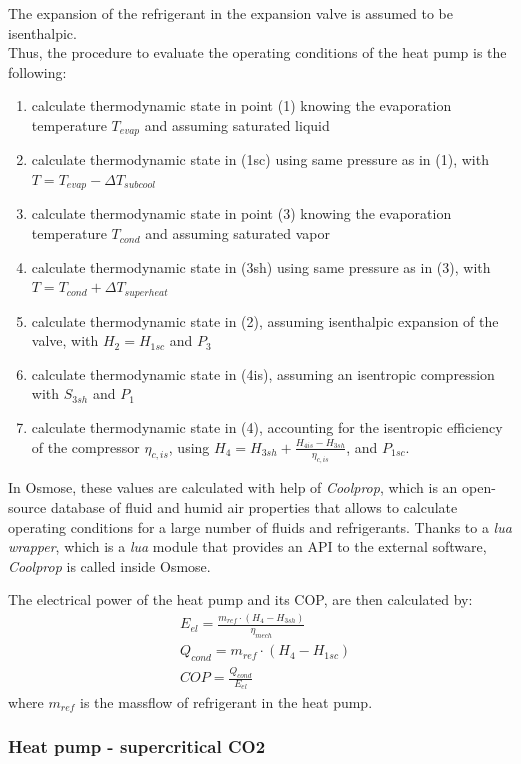 \documentclass{article}
\begin{document}
The expansion of the refrigerant in the expansion valve is assumed to be isenthalpic.\\ 

Thus, the procedure to evaluate the operating conditions of the heat pump is the following:
\begin{enumerate}
	\item calculate thermodynamic state in point (1) knowing the evaporation temperature $T_{evap}$ and assuming saturated liquid
	\item calculate thermodynamic state in (1sc) using same pressure as in (1), with $T = T_{evap} - \Delta T_{subcool}$
	\item calculate thermodynamic state in point (3) knowing the evaporation temperature $T_{cond}$ and assuming saturated vapor
	\item calculate thermodynamic state in (3sh) using same pressure as in (3), with $T = T_{cond} + \Delta T_{superheat}$
	\item calculate thermodynamic state in (2), assuming isenthalpic expansion of the valve, with $H_{2} = H_{1sc}$ and $P_{3}$
	\item calculate thermodynamic state in (4is), assuming an isentropic compression with $S_{3sh}$ and $P_{1}$
	\item calculate thermodynamic state in (4), accounting for the isentropic efficiency of the compressor $\eta_{c,is}$, using $H_{4} = H_{3sh} + \frac{H_{4is} - H_{3sh}}{\eta_{c,is}}$, and $P_{1sc}$.
\end{enumerate}

In Osmose, these values are calculated with help of \textit{Coolprop}, which is an open-source database of fluid and humid air properties that allows to calculate operating conditions for a large number of fluids and refrigerants. Thanks to a \textit{lua wrapper}, which is a \textit{lua} module that provides an API to the external software, \textit{Coolprop} is called inside Osmose.

The electrical power of the heat pump and its COP, are then calculated by:
\begin{align}
	& E_{el} = \frac{m_{ref} \cdot (H_{4}-H_{3sh})}{\eta_{mech}}\\
	& Q_{cond} = m_{ref} \cdot (H_{4}-H_{1sc})\\
	& COP = \frac{Q_{cond}}{E_{el}}
\end{align}
where $m_{ref}$ is the massflow of refrigerant in the heat pump.


\subsubsection{Heat pump - supercritical CO2}\label{sss:hp_CO2}
\end{document}
